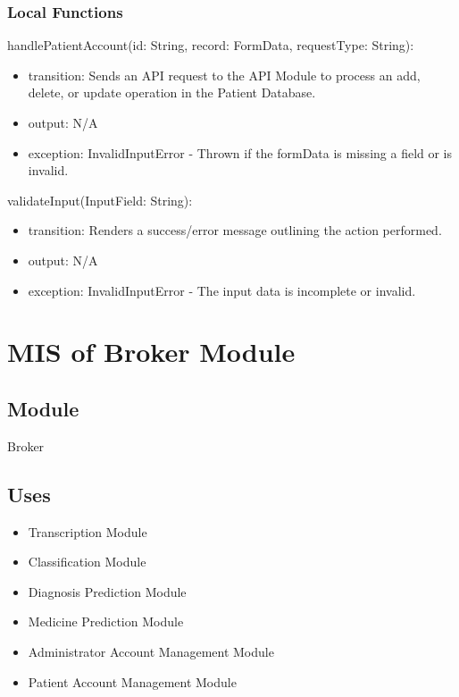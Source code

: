 \documentclass[12pt, titlepage]{article}
\begin{document}
\subsubsection{Local Functions}

\noindent handlePatientAccount(id: String, record: FormData, requestType: String):
\begin{itemize}
\item transition: Sends an API request to the API Module to process an add, delete, or update operation in the Patient Database.
\item output: N/A
\item exception: InvalidInputError - Thrown if the formData is missing a field or is invalid.
\end{itemize}

\noindent validateInput(InputField: String):
\begin{itemize}
\item transition: Renders a success/error message outlining the action performed.
\item output: N/A
\item exception: InvalidInputError - The input data is incomplete or invalid.
\end{itemize}

\newpage

\section{MIS of Broker Module } \label{Module_Broker}


\subsection{Module}
Broker

\subsection{Uses}

\begin{itemize}
  \item Transcription Module
  \item Classification Module
  \item Diagnosis Prediction Module
  \item Medicine Prediction Module
  \item Administrator Account Management Module
  \item Patient Account Management Module
\end{itemize}
\end{document}
